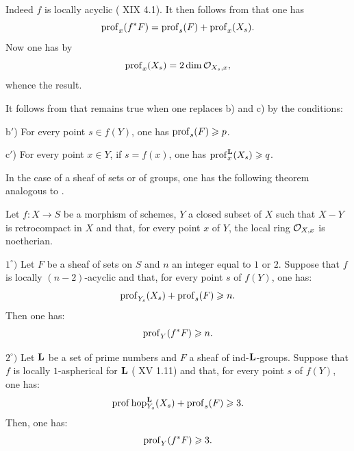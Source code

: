 Indeed $f$ is locally acyclic ( XIX 4.1). It then follows from  that one has
$$
\operatorname{prof}_x(f^*F)=\operatorname{prof}_s(F)+\operatorname{prof}_x(X_s).
$$
Now one has by 
$$
\operatorname{prof}_x(X_s)=2\dim{\mathcal O}_{X_s, x},
$$
whence the result.

\begin{remark} \label{XIV.1.17}
It follows from  that  remains true when one replaces b) and c) by the conditions:

b$'$) For every point $s\in f(Y)$, one has $\operatorname{prof}_s(F)\geqslant p$.

c$'$) For every point $x\in Y$, if $s=f(x)$, one has $\operatorname{prof}^{\mathbf{L}}_x(X_s)\geqslant q$.
\end{remark}

In the case of a sheaf of sets or of groups, one has the following theorem analogous to .

\begin{theorem} \label{XIV.1.18}
Let $f:X\to S$ be a morphism of schemes, $Y$ a closed subset of $X$ such that $X-Y$ is retrocompact in $X$ and that, for every point $x$ of $Y$, the local ring ${\mathcal O}_{X, x}$ is noetherian.

$1^\circ)$ Let $F$ be a sheaf of sets on $S$ and $n$ an integer equal to $1$ or $2$. Suppose that $f$ is locally $(n-2)$-acyclic and that, for every point $s$ of $f(Y)$, one has:
$$
\operatorname{prof}_{Y_s}(X_s)+\operatorname{prof}_s(F)\geqslant n.
$$
Then one has:$$
\operatorname{prof}_Y(f^*F)\geqslant n.
$$

$2^\circ)$ Let $\mathbf{L}$ be a set of prime numbers and $F$ a sheaf of ind-$\mathbf{L}$-groups. Suppose that $f$ is locally $1$-aspherical for $\mathbf{L}$ (\textup{ XV 1.11}) and that, for every point $s$ of $f(Y)$, one has:
$$
\operatorname{prof}\operatorname{hop}^{\mathbf{L}}_{Y_s}(X_s)+\operatorname{prof}_s(F)\geqslant 3.
$$
Then, one has:$$
\operatorname{prof}_Y(f^*F)\geqslant 3.
$$
\end{theorem}

